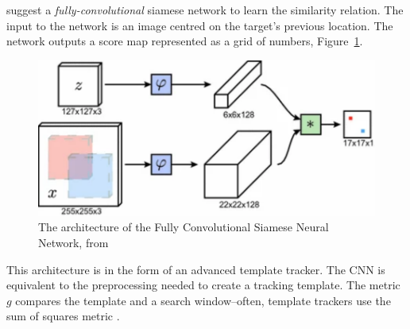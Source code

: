   \citeauthor{bertinetto2016} suggest a \textit{fully-convolutional} siamese network to learn the similarity relation.
  The input to the network is an image centred on the target's previous location.
  The network outputs a score map represented as a grid of numbers, Figure~\ref{fig:convSiamese}.

  \begin{figure}[!ht]
    \centering
    \includegraphics[scale = 0.6]{convSiamese.pdf}
    \caption{The architecture of the Fully Convolutional Siamese Neural Network, from \protect\cite{bertinetto2016}}
    \label{fig:convSiamese}
  \end{figure}

  This architecture is in the form of an advanced template tracker.
  The CNN is equivalent to the preprocessing needed to create a tracking template.
  The metric $g$ compares the template and a search window--often, template trackers use the sum of squares metric \cite{templateUpdate}.

